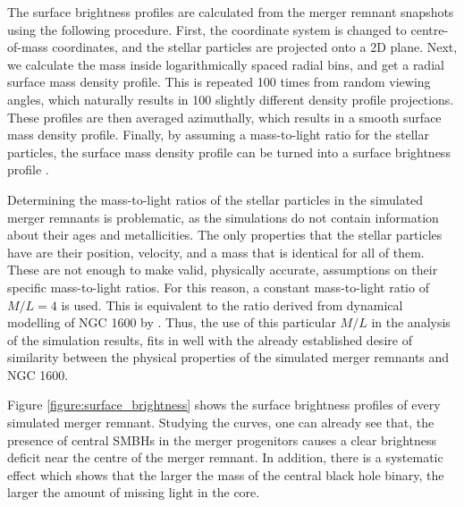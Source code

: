 \documentclass[english, twoside]{HYgradu}
\begin{document}
The surface brightness profiles are calculated from the merger remnant snapshots using the following procedure. First, the coordinate system is changed to centre-of-mass coordinates, and the stellar particles are projected onto a 2D plane. Next, we calculate the mass inside logarithmically spaced radial bins, and get a radial surface mass density profile. This is repeated 100 times from random viewing angles, which naturally results in 100 slightly different density profile projections. These profiles are then averaged azimuthally, which results in a smooth surface mass density profile. Finally, by assuming a mass-to-light ratio for the stellar particles, the surface mass density profile can be turned into a surface brightness profile \citep{Rantala2018}. 

Determining the mass-to-light ratios of the stellar particles in the simulated merger remnants is problematic, as the simulations do not contain information about their ages and metallicities. The only properties that the stellar particles have are their position, velocity, and a mass that is identical for all of them. These are not enough to make valid, physically accurate, assumptions on their specific mass-to-light ratios. For this reason, a constant mass-to-light ratio of $M/L = 4$ is used. This is equivalent to the ratio derived from dynamical modelling of NGC 1600 by \cite{Thomas2016}. Thus, the use of this particular $M/L$ in the analysis of the simulation results, fits in well with the already established desire of similarity between the physical properties of the simulated merger remnants and NGC 1600.

Figure \ref{figure:surface_brightness} shows the surface brightness profiles of every simulated merger remnant. Studying the curves, one can already see that, the presence of central SMBHs in the merger progenitors causes a clear brightness deficit near the centre of the merger remnant. In addition, there is a systematic effect which shows that the larger the mass of the central black hole binary, the larger the amount of missing light in the core.
\end{document}
